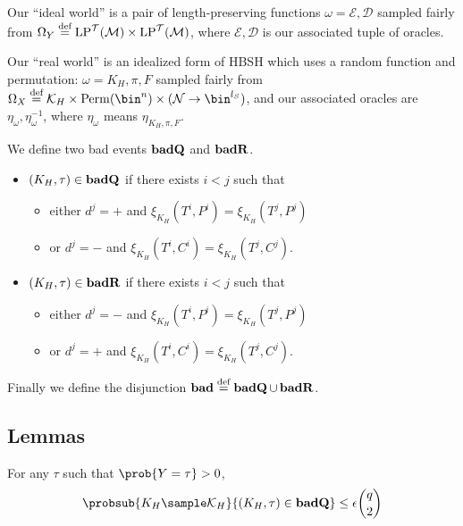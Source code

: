 \documentclass[eprint.tex]{subfiles}
\begin{document}
Our ``ideal world''
is a pair of length-preserving functions
$\omega = \mathcal{E}, \mathcal{D}$
sampled fairly from
$\Omega_Y \stackrel{\text{def}}{=} \operatorname{LP}^\mathcal{T}(\mathcal{M}) \times \operatorname{LP}^\mathcal{T}(\mathcal{M})$,
where $\mathcal{E}, \mathcal{D}$ is our associated tuple of oracles.

Our ``real world'' is an idealized form of HBSH which uses a random function and permutation:
$\omega = K_H, \pi, F$
sampled fairly from
$\Omega_X \defeq \mathcal{K}_H \times \Perm(\bin^n) \times (\mathcal{N} \rightarrow \bin^{l_S})$, and our associated oracles are
$\eta_{\omega}, \eta_{\omega}^{-1}$,  where $\eta_{\omega}$ means $\eta_{K_H, \pi, F}$.

We define two bad events $\operatorname{\mathbf{badQ}}$ and $\operatorname{\mathbf{badR}}$.

\begin{itemize}
    \item $(K_H, \tau) \in \operatorname{\mathbf{badQ}}$ if there exists $i < j$ such that
    \begin{itemize}
        \item either $d^j = +$ and $\xi_{K_H}(T^i, P^i) = \xi_{K_H}(T^j, P^j)$
        \item or $d^j = -$ and $\xi_{K_H}(T^i, C^i) = \xi_{K_H}(T^j, C^j)$.
    \end{itemize}
    \item $(K_H, \tau) \in \operatorname{\mathbf{badR}}$ if there exists $i < j$ such that
    \begin{itemize}
        \item either $d^j = -$ and $\xi_{K_H}(T^i, P^i) = \xi_{K_H}(T^j, P^j)$
        \item or $d^j = +$ and $\xi_{K_H}(T^i, C^i) = \xi_{K_H}(T^j, C^j)$.
    \end{itemize}
\end{itemize}

Finally we define the disjunction
$\operatorname{\mathbf{bad}} \stackrel{\text{def}}{=} \operatorname{\mathbf{badQ}} \cup \operatorname{\mathbf{badR}}$.

\subsection{Lemmas}
\begin{lemma} \label{badQ}
    For any $\tau$ such that $\prob{Y = \tau} > 0$,
    \begin{displaymath}
        \probsub{K_H \sample \mathcal{K}_H}{(K_H, \tau) \in \badQ}
        \leq \epsilon \binom{q}{2}
    \end{displaymath}
\end{lemma}
\end{document}
